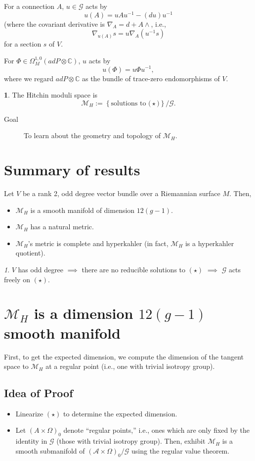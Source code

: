 \documentclass[oneside,english]{amsbook}
\numberwithin{section}{chapter}
\numberwithin{equation}{section}
\numberwithin{figure}{section}
\theoremstyle{plain}
\theoremstyle{definition}
\newtheorem{defn}[thm]{\protect\definitionname}
\theoremstyle{remark}
\newtheorem*{rem*}{\protect\remarkname}
\theoremstyle{definition}
\theoremstyle{definition}
\theoremstyle{plain}
\providecommand{\definitionname}{Definition}
\providecommand{\remarkname}{Remark}
\begin{document}
For a connection $A$, $u\in\mathcal{G}$ acts by
\[
u\left(A\right)=uAu^{-1}-\left(du\right)u^{-1}
\]
(where the covariant derivative is $\nabla_{A}=d+A\wedge$, i.e.,
\[
\nabla_{u\left(A\right)}s=u\nabla_{A}\left(u^{-1}s\right)
\]
for a section $s$ of $V$.

For $\Phi\in\Omega_{M}^{1,0}\left(adP\otimes\mathbb{C}\right)$, $u$
acts by
\[
u\left(\Phi\right)=u\Phi u^{-1},
\]
where we regard $adP\otimes\mathbb{C}$ as the bundle of trace-zero
endomorphisms of $V$.
\begin{defn}
The Hitchin moduli space is
\[
\mathcal{M}_{H}:=\left\{ \mbox{solutions to (}\star\mbox{)}\right\} /\mathcal{G}.
\]
\end{defn}
\begin{description}
\item [{Goal}] To learn about the geometry and topology of $\mathcal{M}_{H}$.
\end{description}

\section{Summary of results}

Let $V$ be a rank 2, odd degree vector bundle over a Riemannian surface
$M$. Then,
\begin{itemize}
\item $\mathcal{M}_{H}$ is a smooth manifold of dimension $12\left(g-1\right)$.
\item $\mathcal{M}_{H}$ has a natural metric.
\item $\mathcal{M}_{H}$'s metric is complete and hyperkahler (in fact,
$\mathcal{M}_{H}$ is a hyperkahler quotient).\end{itemize}
\begin{rem*}
$V$ has odd degree $\implies$ there are no reducible solutions to
$\left(\star\right)$ $\implies$ $\mathcal{G}$ acts freely on $\left(\star\right)$.
\end{rem*}

\section{$\mathcal{M}_{H}$ is a dimension $12\left(g-1\right)$ smooth manifold}

First, to get the expected dimension, we compute the dimension of
the tangent space to $\mathcal{M}_{H}$ at a regular point (i.e.,
one with trivial isotropy group).


\subsection{Idea of Proof}
\begin{itemize}
\item Linearize $(\star)$ to determine the expected dimension.
\item Let $\left(A\times\Omega\right)_{0}$ denote ``regular points,''
i.e., ones which are only fixed by the identity in $\mathcal{G}$
(those with trivial isotropy group). Then, exhibit $\mathcal{M}_{H}$
is a smooth submanifold of $\left(\mathcal{A}\times\Omega\right)_{0}/\mathcal{G}$
using the regular value theorem.
\end{itemize}
\end{document}

